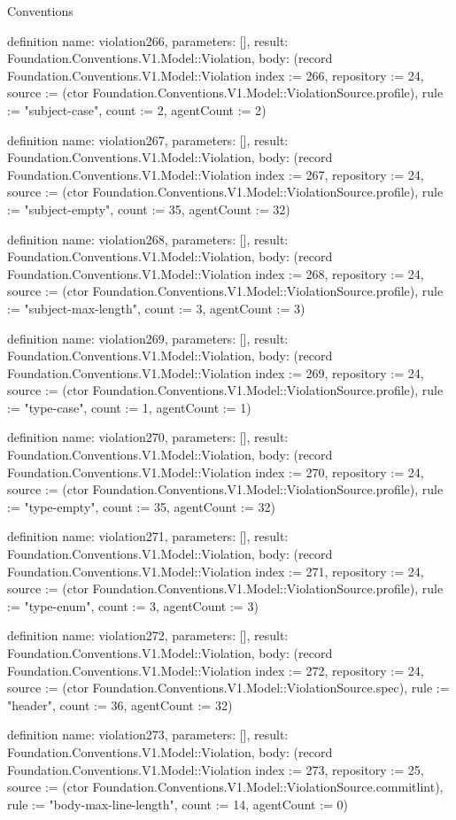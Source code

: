 \begin{lexlean}{Conventions}
\begin{semanticmodule}
definition{
  name: violation266,
  parameters: [],
  result: Foundation.Conventions.V1.Model::Violation,
  body: (record Foundation.Conventions.V1.Model::Violation {index := 266, repository := 24, source := (ctor Foundation.Conventions.V1.Model::ViolationSource.profile), rule := "subject-case", count := 2, agentCount := 2})
}

definition{
  name: violation267,
  parameters: [],
  result: Foundation.Conventions.V1.Model::Violation,
  body: (record Foundation.Conventions.V1.Model::Violation {index := 267, repository := 24, source := (ctor Foundation.Conventions.V1.Model::ViolationSource.profile), rule := "subject-empty", count := 35, agentCount := 32})
}

definition{
  name: violation268,
  parameters: [],
  result: Foundation.Conventions.V1.Model::Violation,
  body: (record Foundation.Conventions.V1.Model::Violation {index := 268, repository := 24, source := (ctor Foundation.Conventions.V1.Model::ViolationSource.profile), rule := "subject-max-length", count := 3, agentCount := 3})
}

definition{
  name: violation269,
  parameters: [],
  result: Foundation.Conventions.V1.Model::Violation,
  body: (record Foundation.Conventions.V1.Model::Violation {index := 269, repository := 24, source := (ctor Foundation.Conventions.V1.Model::ViolationSource.profile), rule := "type-case", count := 1, agentCount := 1})
}

definition{
  name: violation270,
  parameters: [],
  result: Foundation.Conventions.V1.Model::Violation,
  body: (record Foundation.Conventions.V1.Model::Violation {index := 270, repository := 24, source := (ctor Foundation.Conventions.V1.Model::ViolationSource.profile), rule := "type-empty", count := 35, agentCount := 32})
}

definition{
  name: violation271,
  parameters: [],
  result: Foundation.Conventions.V1.Model::Violation,
  body: (record Foundation.Conventions.V1.Model::Violation {index := 271, repository := 24, source := (ctor Foundation.Conventions.V1.Model::ViolationSource.profile), rule := "type-enum", count := 3, agentCount := 3})
}

definition{
  name: violation272,
  parameters: [],
  result: Foundation.Conventions.V1.Model::Violation,
  body: (record Foundation.Conventions.V1.Model::Violation {index := 272, repository := 24, source := (ctor Foundation.Conventions.V1.Model::ViolationSource.spec), rule := "header", count := 36, agentCount := 32})
}

definition{
  name: violation273,
  parameters: [],
  result: Foundation.Conventions.V1.Model::Violation,
  body: (record Foundation.Conventions.V1.Model::Violation {index := 273, repository := 25, source := (ctor Foundation.Conventions.V1.Model::ViolationSource.commitlint), rule := "body-max-line-length", count := 14, agentCount := 0})
}


\end{semanticmodule}
\end{lexlean}
